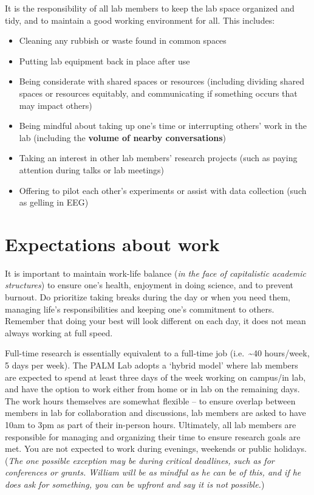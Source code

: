 \documentclass[
]{book}
\providecommand{\tightlist}{%
  \setlength{\itemsep}{0pt}\setlength{\parskip}{0pt}}
\begin{document}
It is the responsibility of all lab members to keep the lab space organized and tidy, and to maintain a good working environment for all. This includes:

\begin{itemize}
\tightlist
\item
  Cleaning any rubbish or waste found in common spaces
\item
  Putting lab equipment back in place after use
\item
  Being considerate with shared spaces or resources (including dividing shared spaces or resources equitably, and communicating if something occurs that may impact others)
\item
  Being mindful about taking up one's time or interrupting others' work in the lab (including the \textbf{volume of nearby conversations})
\item
  Taking an interest in other lab members' research projects (such as paying attention during talks or lab meetings)
\item
  Offering to pilot each other's experiments or assist with data collection (such as gelling in EEG)
\end{itemize}

\hypertarget{lab-work}{%
\section{Expectations about work}\label{lab-work}}

It is important to maintain work-life balance (\emph{in the face of capitalistic academic structures}) to ensure one's health, enjoyment in doing science, and to prevent burnout. Do prioritize taking breaks during the day or when you need them, managing life's responsibilities and keeping one's commitment to others. Remember that doing your best will look different on each day, it does not mean always working at full speed.

Full-time research is essentially equivalent to a full-time job (i.e.~\textasciitilde40 hours/week, 5 days per week). The PALM Lab adopts a `hybrid model' where lab members are expected to spend at least three days of the week working on campus/in lab, and have the option to work either from home or in lab on the remaining days. The work hours themselves are somewhat flexible -- to ensure overlap between members in lab for collaboration and discussions, lab members are asked to have 10am to 3pm as part of their in-person hours. Ultimately, all lab members are responsible for managing and organizing their time to ensure research goals are met. You are not expected to work during evenings, weekends or public holidays. (\emph{The one possible exception may be during critical deadlines, such as for conferences or grants. William will be as mindful as he can be of this, and if he does ask for something, you can be upfront and say it is not possible.})
\end{document}
